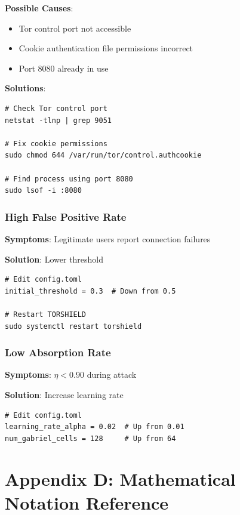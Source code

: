 \documentclass[11pt,a4paper]{article}
\begin{document}
\textbf{Possible Causes}:
\begin{itemize}
\item Tor control port not accessible
\item Cookie authentication file permissions incorrect
\item Port 8080 already in use
\end{itemize}

\textbf{Solutions}:
\begin{verbatim}
# Check Tor control port
netstat -tlnp | grep 9051

# Fix cookie permissions
sudo chmod 644 /var/run/tor/control.authcookie

# Find process using port 8080
sudo lsof -i :8080
\end{verbatim}

\subsubsection{High False Positive Rate}

\textbf{Symptoms}: Legitimate users report connection failures

\textbf{Solution}: Lower threshold
\begin{verbatim}
# Edit config.toml
initial_threshold = 0.3  # Down from 0.5

# Restart TORSHIELD
sudo systemctl restart torshield
\end{verbatim}

\subsubsection{Low Absorption Rate}

\textbf{Symptoms}: $\eta < 0.90$ during attack

\textbf{Solution}: Increase learning rate
\begin{verbatim}
# Edit config.toml
learning_rate_alpha = 0.02  # Up from 0.01
num_gabriel_cells = 128     # Up from 64
\end{verbatim}

\section{Appendix D: Mathematical Notation Reference}
\end{document}
